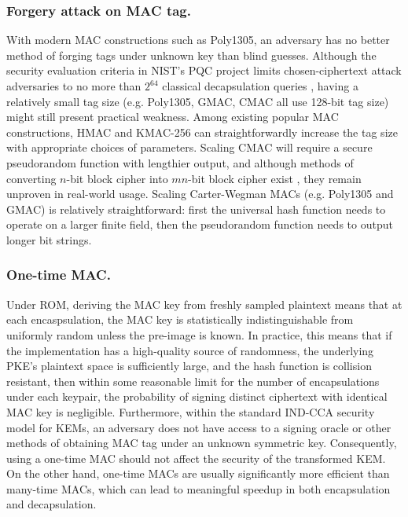 \documentclass[runningheads]{llncs}
\begin{document}
\subsubsection{Forgery attack on MAC tag.} With modern MAC constructions such as Poly1305, an adversary has no better method of forging tags under unknown key than blind guesses. Although the security evaluation criteria in NIST's PQC project limits chosen-ciphertext attack adversaries to no more than $2^{64}$ classical decapsulation queries \cite{NIST_PQC_Evaluation}, having a relatively small tag size (e.g. Poly1305, GMAC, CMAC all use 128-bit tag size) might still present practical weakness. Among existing popular MAC constructions, HMAC and KMAC-256 can straightforwardly increase the tag size with appropriate choices of parameters. Scaling CMAC will require a secure pseudorandom function with lengthier output, and although methods of converting $n$-bit block cipher into $mn$-bit block cipher exist \cite{DBLP:conf/ctrsa/HaleviR04}, they remain unproven in real-world usage. Scaling Carter-Wegman MACs \cite{DBLP:journals/jcss/CarterW79,DBLP:journals/jcss/WegmanC81} (e.g. Poly1305 and GMAC) is relatively straightforward: first the universal hash function needs to operate on a larger finite field, then the pseudorandom function needs to output longer bit strings.

\subsubsection{One-time MAC.} Under ROM, deriving the MAC key from freshly sampled plaintext means that at each encaspsulation, the MAC key is statistically indistinguishable from uniformly random unless the pre-image is known. In practice, this means that if the implementation has a high-quality source of randomness, the underlying PKE's plaintext space is sufficiently large, and the hash function is collision resistant, then within some reasonable limit for the number of encapsulations under each keypair, the probability of signing distinct ciphertext with identical MAC key is negligible. Furthermore, within the standard IND-CCA security model for KEMs, an adversary does not have access to a signing oracle or other methods of obtaining MAC tag under an unknown symmetric key. Consequently, using a one-time MAC should not affect the security of the transformed KEM. On the other hand, one-time MACs are usually significantly more efficient than many-time MACs, which can lead to meaningful speedup in both encapsulation and decapsulation.
\end{document}
